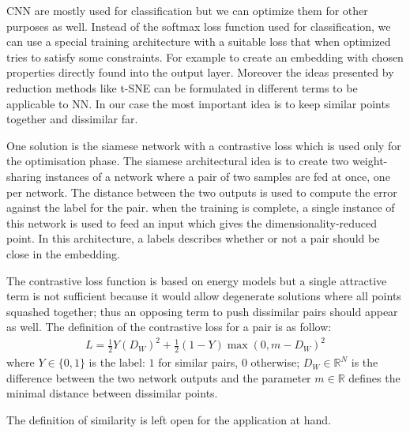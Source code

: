 \documentclass[a4paper,12pt]{report}
\newcommand{\R}{\mathbb{R}}
\begin{document}
CNN are mostly used for classification but we can optimize them for other purposes as well.
Instead of the softmax loss function used for classification, we can use a special training architecture with a suitable loss that when optimized tries to satisfy some constraints.
For example to create an embedding with chosen properties directly found into the output layer.
Moreover the ideas presented by reduction methods like t-SNE can be formulated in different terms to be applicable to NN.
In our case the most important idea is to keep similar points together and dissimilar far.

One solution is the siamese network with a contrastive loss which is used only for the optimisation phase.
The siamese architectural idea is to create two weight-sharing instances of a network where a pair of two samples are fed at once, one per network.
The distance between the two outputs is used to compute the error against the label for the pair.
when the training is complete, a single instance of this network is used to feed an input which gives the dimensionality-reduced point.
In this architecture, a labels describes whether or not a pair should be close in the embedding.

The contrastive loss function is based on energy models but a single attractive term is not sufficient because it would allow degenerate solutions where all points squashed together; thus an opposing term to push dissimilar pairs should appear as well.
The definition of the contrastive loss for a pair is as follow:
\begin{eqnarray}
    L = \frac{1}{2} Y (D_W)^2 + \frac{1}{2} (1-Y) \max(0, m - D_W)^2
\end{eqnarray}
where $Y \in \{0,1\}$ is the label: $1$ for similar pairs, $0$ otherwise; $D_W \in \R^N$ is the difference between the two network outputs and the parameter $m \in \R$ defines the minimal distance between dissimilar points.

The definition of similarity is left open for the application at hand.
\end{document}
